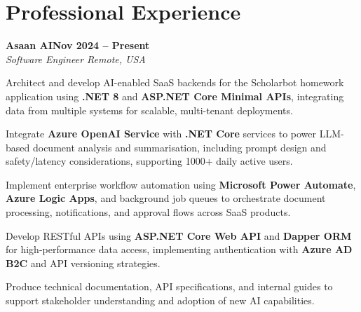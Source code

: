 \documentclass[letterpaper,10pt]{article}
\newcommand{\headingBf}[2]{
  \hspace{10pt}\textbf{#1}\hfill\textbf{#2}\\
}
\newcommand{\headingIt}[2]{
  \hspace{10pt}\textit{#1}\hfill\textit{#2}\\
}
\newenvironment{resume_list}{
  \vspace{-7pt}
  \begin{itemize}[itemsep=-2px, parsep=1pt, leftmargin=30pt]
}{
  \end{itemize}
}
\begin{document}
\section{Professional Experience}

\headingBf{Asaan AI}{Nov 2024 -- Present}
\headingIt{Software Engineer \hfill Remote, USA}{}
\begin{resume_list}
    \item Architect and develop AI-enabled SaaS backends for the Scholarbot homework application using \textbf{.NET 8} and \textbf{ASP.NET Core Minimal APIs}, integrating data from multiple systems for scalable, multi-tenant deployments.
    \item Integrate \textbf{Azure OpenAI Service} with \textbf{.NET Core} services to power LLM-based document analysis and summarisation, including prompt design and safety/latency considerations, supporting 1000+ daily active users.
    \item Implement enterprise workflow automation using \textbf{Microsoft Power Automate}, \textbf{Azure Logic Apps}, and background job queues to orchestrate document processing, notifications, and approval flows across SaaS products.
    \item Develop RESTful APIs using \textbf{ASP.NET Core Web API} and \textbf{Dapper ORM} for high-performance data access, implementing authentication with \textbf{Azure AD B2C} and API versioning strategies.
    \item Produce technical documentation, API specifications, and internal guides to support stakeholder understanding and adoption of new AI capabilities.
\end{resume_list}
\end{document}
